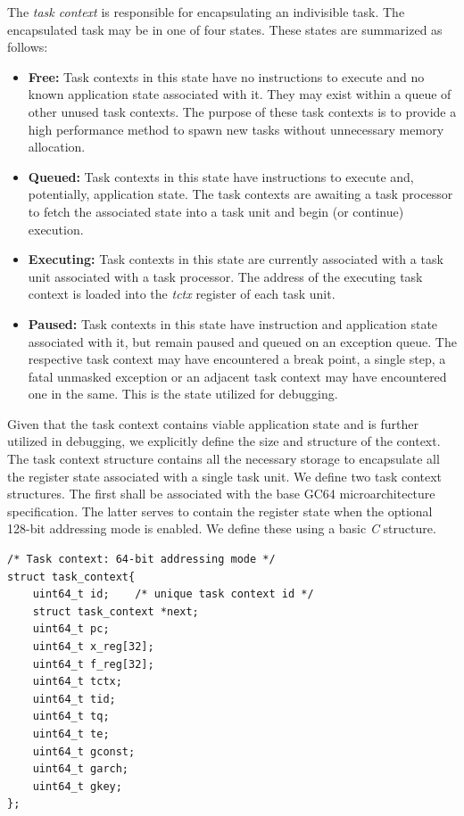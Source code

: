\documentclass{article}
\begin{document}
The \emph{task context} is responsible for encapsulating an indivisible 
task.  The encapsulated task may be in one of four states.  These states are summarized 
as follows: 

\begin{itemize}
\item \textbf{Free:} Task contexts in this state have no instructions to execute and no known application state associated with it.  They may exist
within a queue of other unused task contexts.  The purpose of these task contexts is to provide a high performance method to spawn new 
tasks without unnecessary memory allocation.    
\item \textbf{Queued:} Task contexts in this state have instructions to execute and, potentially, application state.  The task contexts 
are awaiting a task processor to fetch the associated state into a task unit and begin (or continue) execution.  
\item \textbf{Executing:} Task contexts in this state are currently associated with a task unit associated with a task processor.  The
address of the executing task context is loaded into the \emph{tctx} register of each task unit.   
\item \textbf{Paused:} Task contexts in this state have instruction and application state associated with it, but remain paused
and queued on an exception queue.  The respective task context may have encountered a break point, a single step, a fatal 
unmasked exception or an adjacent task context may have encountered one in the same.  This is the state utilized for debugging.  
\end{itemize}

Given that the task context contains viable application state and is further utilized in debugging, we explicitly define the 
size and structure of the context.  The task context structure contains all the necessary storage to encapsulate all the
register state associated with a single task unit.  We define two task context structures.  The first shall be associated 
with the base GC64 microarchitecture specification.  The latter serves to contain the register state when the optional 
128-bit addressing mode is enabled.  We define these using a basic \emph{C} structure.    

\begin{verbatim}
/* Task context: 64-bit addressing mode */
struct task_context{
	uint64_t id;	/* unique task context id */
	struct task_context *next;
	uint64_t pc;
	uint64_t x_reg[32];
	uint64_t f_reg[32];
	uint64_t tctx;
	uint64_t tid;
	uint64_t tq;
	uint64_t te;
	uint64_t gconst;
	uint64_t garch;
	uint64_t gkey;
};
\end{verbatim}
  
\end{document}
